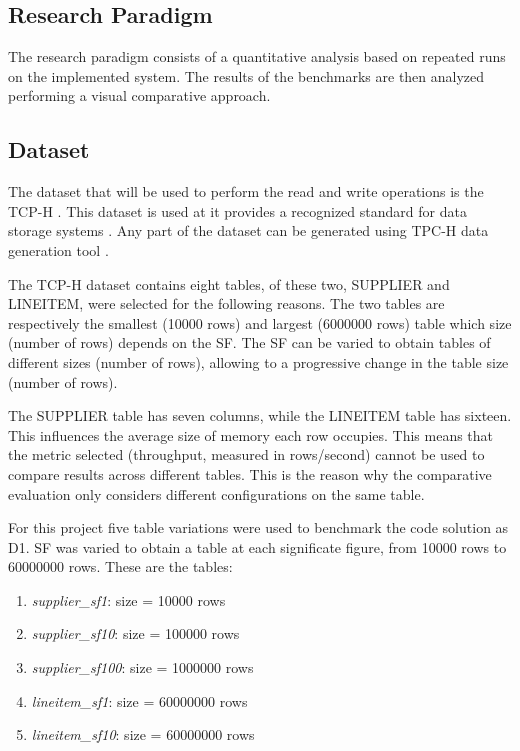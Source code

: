\subsection{Research Paradigm}
The research paradigm consists of a quantitative analysis based on repeated runs on the implemented system. The results of the benchmarks are then analyzed performing a visual comparative approach.

\subsection{Dataset}
\label{subsec:dataset}

The dataset that will be used to perform the read and write operations is the TCP-H \cite{TPCHHomepage}. This dataset is used at it provides a recognized standard for data storage systems \cite{TPC_benchmarks_2000}. Any part of the dataset can be generated using TPC-H data generation tool \cite{TPCCurrentSpecs}.

The TCP-H dataset contains eight tables, of these two, SUPPLIER and LINEITEM, were selected for the following reasons. The two tables are respectively the smallest (10000 rows) and largest (6000000 rows) table which size (number of rows) depends on the \gls{SF}. The \gls{SF} can be varied to obtain tables of different sizes (number of rows), allowing to a progressive change in the table size (number of rows). 

The SUPPLIER table has seven columns, while the LINEITEM table has sixteen. This influences the average size of memory each row occupies. This means that the metric selected (throughput, measured in rows/second) cannot be used to compare results across different tables. This is the reason why the comparative evaluation only considers different configurations on the same table. 

For this project five table variations were used to benchmark the code solution as D1. \gls{SF} was varied to obtain a table at each significate figure, from 10000 rows to 60000000 rows. These are the tables:
\begin{enumerate}
    \item \textit{supplier\_sf1}: size = 10000 rows
    \item \textit{supplier\_sf10}: size = 100000 rows
    \item \textit{supplier\_sf100}: size = 1000000 rows
    \item \textit{lineitem\_sf1}: size = 60000000 rows
    \item \textit{lineitem\_sf10}: size = 60000000 rows
\end{enumerate}

